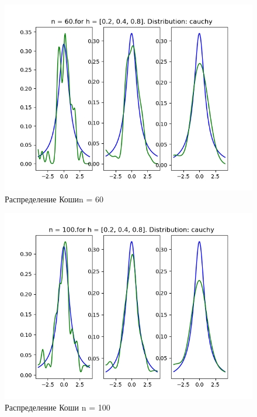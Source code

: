 \documentclass[a4]{article}
\begin{document}
\begin{center}
\begin{figure}[h!]
			\includegraphics[width=\textwidth]{cauchyker60.png}
			\caption[Распределение Коши n = 60]{Распределение Кошиn = 60}
		\end{figure}
		\newpage
		\begin{figure}[h!]
			\includegraphics[width=\textwidth]{cauchyker100.png}
			\caption[Распределение Коши n = 100]{Распределение Коши n = 100}
		\end{figure}
		\newpage
		\begin{figure}[h!]

\end{figure}
\end{center}
\end{document}
